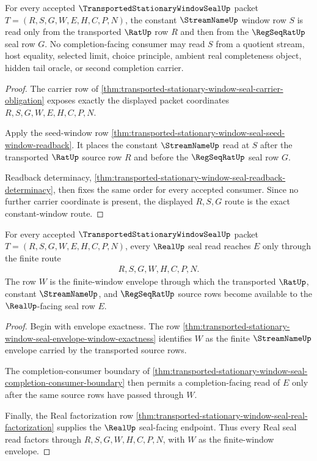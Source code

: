 \begin{theorem}
\label{thm:transported-stationary-window-seal-constant-window-exactness}
For every accepted $\TransportedStationaryWindowSealUp$ packet $T=(R,S,G,W,E,H,C,P,N)$, the constant $\StreamNameUp$ window row $S$ is read only from the transported $\RatUp$ row $R$ and then from the $\RegSeqRatUp$ seal row $G$. No completion-facing consumer may read $S$ from a quotient stream, host equality, selected limit, choice principle, ambient real completeness object, hidden tail oracle, or second completion carrier.
\end{theorem}
\begin{proof}
The carrier row of \autoref{thm:transported-stationary-window-seal-carrier-obligation} exposes exactly the displayed packet coordinates $R,S,G,W,E,H,C,P,N$.

Apply the seed-window row \autoref{thm:transported-stationary-window-seal-seed-window-readback}. It places the constant $\StreamNameUp$ read at $S$ after the transported $\RatUp$ source row $R$ and before the $\RegSeqRatUp$ seal row $G$.

Readback determinacy, \autoref{thm:transported-stationary-window-seal-readback-determinacy}, then fixes the same order for every accepted consumer. Since no further carrier coordinate is present, the displayed $R,S,G$ route is the exact constant-window route.
\end{proof}

\begin{theorem}
\label{thm:transported-stationary-window-seal-real-seal-factorization}
For every accepted $\TransportedStationaryWindowSealUp$ packet $T=(R,S,G,W,E,H,C,P,N)$, every $\RealUp$ seal read reaches $E$ only through the finite route
$$
\begin{aligned}
  R,S,G,W,H,C,P,N .
\end{aligned}
$$
The row $W$ is the finite-window envelope through which the transported $\RatUp$, constant $\StreamNameUp$, and $\RegSeqRatUp$ source rows become available to the $\RealUp$-facing seal row $E$.
\end{theorem}
\begin{proof}
Begin with envelope exactness. The row \autoref{thm:transported-stationary-window-seal-envelope-window-exactness} identifies $W$ as the finite $\StreamNameUp$ envelope carried by the transported source rows.

The completion-consumer boundary of \autoref{thm:transported-stationary-window-seal-completion-consumer-boundary} then permits a completion-facing read of $E$ only after the same source rows have passed through $W$.

Finally, the Real factorization row \autoref{thm:transported-stationary-window-seal-real-factorization} supplies the $\RealUp$ seal-facing endpoint. Thus every Real seal read factors through $R,S,G,W,H,C,P,N$, with $W$ as the finite-window envelope.
\end{proof}

